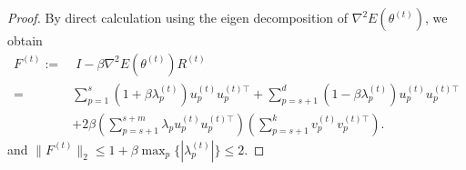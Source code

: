 \documentclass[final]{siamart251216}
\begin{document}
\begin{proof}
By direct calculation using the eigen decomposition of $\nabla^2E(\theta^{(t)})$, we obtain
\begin{equation}\label{eqn:expan}
\begin{aligned}
F^{(t)} :=&\; I-\beta\nabla ^2E(\theta^{(t)})R^{(t)}  \\
=&\sum_{p=1}^s   
\left(1+\beta\lambda_p^{(t)}\right)
u_p^{(t)}{u_p^{(t)\top}}
+ \sum_{p=s+1}^{d}
\left(1-\beta\lambda_p^{(t)}\right)
u_p^{(t)}{u_p^{(t)\top}}
\\
&
+2\beta
\left(\sum_{p=s+1}^{s+m} \lambda_pu_p^{(t)}u_p^{(t)\top}\right)
\left(\sum_{p=s+1}^k v_p^{(t)}{v_p^{(t)\top}}\right).
\end{aligned}
\end{equation}
and $\|F^{(t)}\|_2\leqslant 1+\beta \max_{p}\{|\lambda_p^{(t)}|\}\leqslant 2$.


\end{proof}
\end{document}
